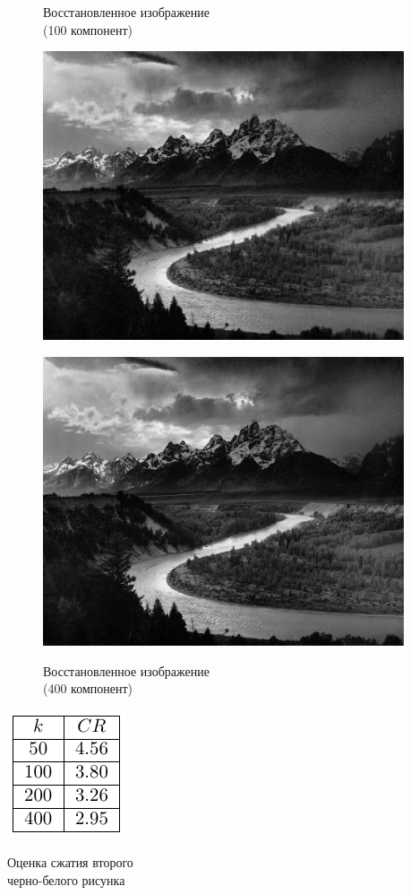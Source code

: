 \documentclass[a4paper]{article}
\begin{document}
\begin{figure}[H]
    \begin{minipage}{.5\textwidth}
      \centering
    \caption{Восстановленное изображение \\(100 компонент)}
    \includegraphics[width = 0.95\textwidth]{reconstructions/with_100comps_Adams_The_Tetons_and_the_Snake_River.jpg}
    \label{fig:mount_100}
    \hspace{8 mm}
    \caption{Восстановленное изображение \\(400 компонент)}
    \includegraphics[width = 0.95\textwidth]{reconstructions/with_400comps_Adams_The_Tetons_and_the_Snake_River.jpg}
    \label{fig:mount_400}
    \end{minipage}%
\end{figure}
\begin{table}[H]
    \centering
    \includegraphics[]{tables/CR_for_Adams_The_Tetons_and_the_Snake_River.pdf}
    \caption{Оценка сжатия второго\\черно-белого рисунка}
    \label{tab:mount}
\end{table}
\end{document}
